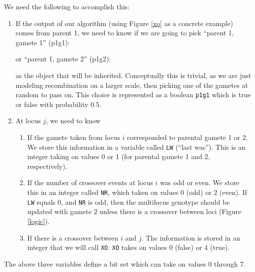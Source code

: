 \documentclass{article}
\begin{document}
We need the following to accomplish this:
\begin{enumerate}
\item If the output of our algorithm (using  Figure \ref{xo} as a concrete example) comes from parent 1, we need to know if we are going to pick ``parent 1, gamete 1'' (p1g1):
or ``parent 1, gamete 2'' (p1g2):
as the object that will be inherited.  Conceptually this is trivial, as we are just modeling recombination on a larger scale, then picking one of the gametes at random to pass on.  This choice is represented as a boolean \texttt{p1g1} which is true or false with probability 0.5.
\item At locus $j$, we need to know
  \begin{enumerate}
  \item If the gamete taken from locus $i$ corresponded to parental gamete 1 or 2.  We store this information in a variable called \texttt{LW} (``last was'').  This is an integer taking on values 0 or 1 (for parental gamete 1 and 2, respectively).
  \item If the number of crossover events at locus $i$ was odd or even.  We store this in an integer called \texttt{NR}, which taken on values 0 (odd) or 2 (even).  If \texttt{LW} equals 0, and \texttt{NR} is odd, then the multilocus genotype should be updated with gamete 2 unless there is a crossover between loci (Figure \ref{logic}).
  \item If there is a crossover between $i$ and $j$.  The information is stored in an integer that we will call \texttt{XO}.  \texttt{XO} takes on values 0 (false) or 4 (true).
  \end{enumerate}
\end{enumerate}
The above three variables define a bit set which can take on values 0 through 7.
\end{document}
